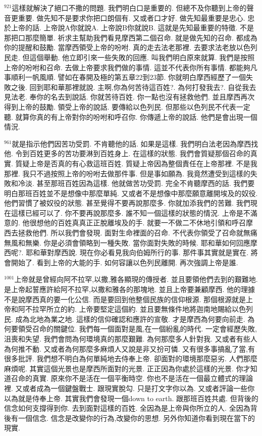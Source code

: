 \documentclass{book}
\begin{document}
$^{921}$這樣就解決了絕口不撒的問題.
我們明白口是重要的.
但總不及你聽到上帝的聲音更重要.
做先知不是要求你把口朗個有.
又或者口才好.
做先知最重要是忠心.
忠於上帝的話.
上帝說A你就說A.
上帝說B你就說B.
這就是先知最重要的特徵.
不是那把口那麼簡單.
祈求主幫助我們看見摩西第二個召命.
就是做先知的召命.
都成為你的提醒和鼓勵.
當摩西領受上帝的吩咐.
真的走去法老那裡.
去要求法老放以色列民走.
但這個舉動.
他立即引來一些失敗的回應.
叫我們明白原來就算.
我們是按照上帝的吩咐和召命.
去做上帝要求我們做的事情.
這並不代表你所有事情.
都能夠凡事順利一帆風順.
譬如在春開及極的第五章22到23節.
你就明白摩西經歷了一個失敗之後.
回到耶和華那裡就說.
主啊,你為何苦待這百姓?.
為何打發我去?.
自從我去見法老.
奉你的名去到說話.
你就苦待百姓.
你一點也沒有拯救他們.
並且摩西再次得到上帝的鼓勵.
領受上帝的說話.
要傳給以色列民.
但那些以色列民不代表一定聽.
就算你真的有上帝對你的吩咐和呼召你.
你傳遞上帝的說話.
他們是會出現一個情況.

$^{961}$就是指示他們因苦功受罰.
不肯聽他的話.
如果是這樣.
我們明白法老因為摩西找他.
令到百姓更多的苦功要淋到百姓身上.
在這樣的狀態.
我們會質疑那個召命的真實.
質疑上帝是否真的有心救這班百姓.
質疑上帝因為整個責任在上帝那裡.
不是我那裡.
我只不過按照上帝的吩咐去做那件事.
但是事如願為.
我竟然遭受到這樣的失敗和冷淡.
甚至那班百姓因為這樣.
他就做苦功受罰.
完全不肯聽摩西的話.
我們要明白那班百姓並不是想像中那麼單純.
又或者不是想像中那麼願意離開埃及的奴役.
他們習慣了被奴役的狀態.
甚至覺得不要再說那麼多.
你就加添我們的苦難.
我們現在這樣已經可以了.
你不要再說那麼多.
誰不知一個這樣的狀態的情況.
上帝是不滿意的.
他很想他的百姓真真正正脫離埃及的手.
就要一不做二不休地引領和呼召摩西去拯救他們.
所以我們會發現.
面對生命裡面的召命.
不代表你領受了召命就無痛無風和無樂.
你是必須會領略到一種失敗.
當你面對失敗的時候.
耶和華如何回應摩西呢?.
耶和華對摩西說.
現在你必看見我向伯姆所行的事.
那件事其實就是實在.
將會開始了.
看到上帝的大能的手.
如何容讓以色列民離開.
再次強調上帝是誰.

$^{1001}$上帝就是曾經向阿不拉罕,以撒,雅各顯現的傳授者.
並且要領他們去到的艱難地.
是上帝起誓應許給阿不拉罕,以撒和雅各的那塊地.
並且上帝要兼顧摩西.
他的理據不是說摩西真的要一化公信.
而是要回到他整個民族的信仰根源.
那個根源就是上帝和阿不拉罕所立的約.
上帝要堅定這個約.
並且要無條件地將迦南地賜給以色列民.
成為北地為業之地.
這樣的信仰確認和應許的宣敬.
才是摩西為何要向前走.
為何要領受召命的關鍵位.
我們每一個面對是風,在一個紛亂的時代.
一定會經歷失敗,沮喪和失望.
我們會問為何環境真的那麼艱難.
為何那麼多人針對我.
又或者有些人為何推不動.
又或者為何那麼多麻煩人又說是非又扮可憐.
又有很多事搞亂了當,有很多批評.
我們想不明白為何單純地去侍奉上帝.
卻面對的環境那麼惡劣.
人們那麼麻煩呢.
其實這個光景也是摩西所面對的光景.
正正因為你處於這樣的光景.
你才知道召命的真實.
原來你不是活在一個平衡時空.
你也不是活在一個最立體式的理論裡.
又或者成為一個鍵盤戰士.
跟現實脫勾.
只是打文字你以為.
又或者評論一些你以為就是侍奉上帝.
其實我們會發現一個down to earth.
跟那班百姓共處.
但背後的信念如何支撐得到你.
去到面對這樣的百姓.
全因為是上帝與你所立的人.
全因為背後有一個信念.
信念是改變你的行為,改變你的思想.
另外你知道你看到現在當下的現實.
\end{document}
